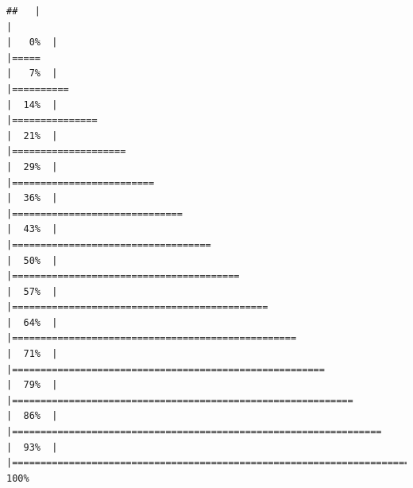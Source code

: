 \documentclass[
]{book}
\begin{document}
\begin{verbatim}
##   |                                                                              |                                                                      |   0%  |                                                                              |=====                                                                 |   7%  |                                                                              |==========                                                            |  14%  |                                                                              |===============                                                       |  21%  |                                                                              |====================                                                  |  29%  |                                                                              |=========================                                             |  36%  |                                                                              |==============================                                        |  43%  |                                                                              |===================================                                   |  50%  |                                                                              |========================================                              |  57%  |                                                                              |=============================================                         |  64%  |                                                                              |==================================================                    |  71%  |                                                                              |=======================================================               |  79%  |                                                                              |============================================================          |  86%  |                                                                              |=================================================================     |  93%  |                                                                              |======================================================================| 100%
\end{verbatim}
\end{document}
